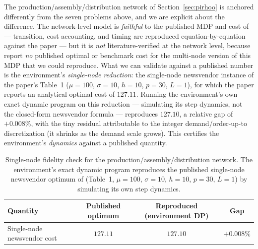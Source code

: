 \documentclass[11pt]{article}
\begin{document}
The production/assembly/distribution network of Section~\ref{sec:pirhoo} is anchored differently from
the seven problems above, and we are explicit about the difference. The network-level model is
\emph{faithful} to the published MDP and cost of \citet{pirhooshyaran2021scn} --- transition, cost
accounting, and timing are reproduced equation-by-equation against the paper --- but it is \emph{not}
literature-verified at the network level, because \citet{pirhooshyaran2021scn} report \emph{no}
published optimal or benchmark cost for the multi-node version of this MDP that we could reproduce.
What we can validate against a published number is the environment's \emph{single-node reduction}: the
single-node newsvendor instance of the paper's Table~1 ($\mu=100$, $\sigma=10$, $h=10$, $p=30$, $L=1$),
for which the paper reports an analytical optimal cost of $127.11$. Running the environment's own exact
dynamic program on this reduction --- simulating its step dynamics, not the closed-form newsvendor
formula --- reproduces $127.10$, a relative gap of $+0.008\%$, with the tiny residual attributable to
the integer demand/order-up-to discretization (it shrinks as the demand scale grows). This certifies
the environment's \emph{dynamics} against a published quantity.

\begin{table}[!htbp]
\centering
\caption{Single-node fidelity check for the production/assembly/distribution network. The
environment's exact dynamic program reproduces the published single-node newsvendor optimum of
\citet{pirhooshyaran2021scn} (Table~1, $\mu=100$, $\sigma=10$, $h=10$, $p=30$, $L=1$) by simulating
its own step dynamics.}
\label{tab:pirhoo-validation}
\begin{tabular}{lccc}
\toprule
Quantity & Published optimum & Reproduced (environment DP) & Gap \\
\midrule
Single-node newsvendor cost & $127.11$ & $127.10$ & $+0.008\%$ \\
\bottomrule
\end{tabular}
\end{table}
\FloatBarrier
\end{document}
